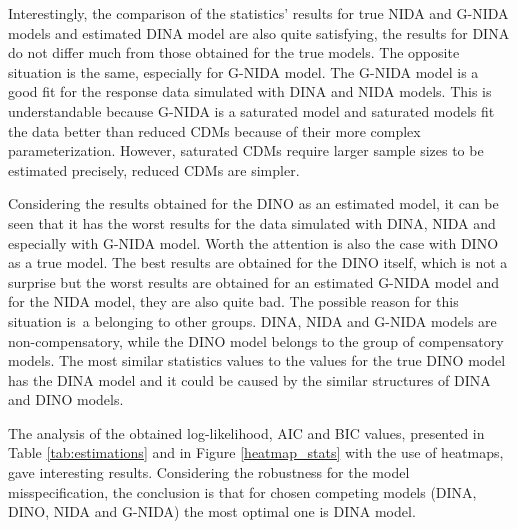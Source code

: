 \documentclass[english]{pwr_wmat_praca_dyplomowa}
\theoremstyle{plain}
\theoremstyle{definition}
\numberwithin{theorem}{chapter}
\begin{document}
Interestingly, the comparison of the statistics' results for true NIDA and G-NIDA models and estimated DINA model are also quite satisfying, the results for DINA do not differ much from those obtained for the true models. The opposite situation is the same, especially for G-NIDA model. The G-NIDA model is a good fit for the response data simulated with DINA and NIDA models. This is understandable because G-NIDA is a saturated model and saturated models ﬁt the data better than reduced CDMs because of their more complex parameterization. However, saturated CDMs require larger sample sizes to be estimated precisely, reduced CDMs are simpler. 

Considering the results obtained for the DINO as an estimated model, it can be seen that it has the worst results for the data simulated with DINA, NIDA and especially with G-NIDA model. Worth the attention is also the case with DINO as a true model. The best results are obtained for the DINO itself, which is not a surprise but the worst results are obtained for an estimated G-NIDA model and for the NIDA model, they are also quite bad. The possible reason for this situation is~a belonging to other groups. DINA, NIDA and G-NIDA models are non-compensatory, while the DINO model belongs to the group of compensatory models. The most similar statistics values to the values for the true DINO model has the DINA model and it could be caused by the similar structures of DINA and DINO models. 

The analysis of the obtained log-likelihood, AIC and BIC values, presented in Table \ref{tab:estimations} and in Figure \ref{heatmap_stats} with the use of heatmaps, gave interesting results. Considering the robustness for the model misspecification, the conclusion is that for chosen competing models (DINA, DINO, NIDA and G-NIDA) the most optimal one is DINA model.
\end{document}
